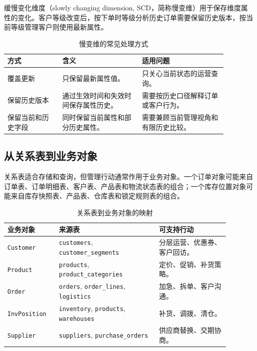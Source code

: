 缓慢变化维度（slowly changing dimension, SCD，简称慢变维）用于保存维度属性的变化。客户等级改变后，按下单时等级分析历史订单需要保留历史版本，按当前等级管理客户则使用最新属性。

\begin{table}[htbp]
\centering
\caption{慢变维的常见处理方式}
\begin{tabular}{P{0.22\linewidth}P{0.32\linewidth}P{0.34\linewidth}}
\toprule
{}
方式 & 含义 & 适用问题\\
\midrule
覆盖更新 & 只保留最新属性值。 & 只关心当前状态的运营查询。\\
保留历史版本 & 通过生效时间和失效时间保存属性历史。 & 需要按历史口径解释订单或客户行为。\\
保留当前和历史字段 & 同时保留当前属性和部分历史属性。 & 需要兼顾当前管理视角和有限历史比较。\\
\bottomrule
\end{tabular}
\end{table}

\subsection{从关系表到业务对象}

关系表适合存储和查询，但管理行动通常作用于业务对象。一个订单对象可能来自订单表、订单明细表、客户表、产品表和物流状态表的组合；一个库存位置对象可能来自库存快照表、产品表、仓库表和锁定规则表的组合。

\begin{table}[htbp]
\centering
\caption{关系表到业务对象的映射}
\begin{tabular}{P{0.20\linewidth}P{0.40\linewidth}P{0.29\linewidth}}
\toprule
{}
业务对象 & 来源表 & 可支持行动\\
\midrule
\texttt{Customer} & \texttt{customers}, \texttt{customer\_segments} & 分层运营、优惠券、客户回访。\\
\texttt{Product} & \texttt{products}, \texttt{product\_categories} & 定价、促销、补货策略。\\
\texttt{Order} & \texttt{orders}, \texttt{order\_lines}, \texttt{logistics} & 加急、拆单、客户沟通。\\
\texttt{InvPosition} & \texttt{inventory}, \texttt{products}, \texttt{warehouses} & 补货、调拨、清仓。\\
\texttt{Supplier} & \texttt{suppliers}, \texttt{purchase\_orders} & 供应商替换、交期协商。\\
\bottomrule
\end{tabular}
\end{table}

